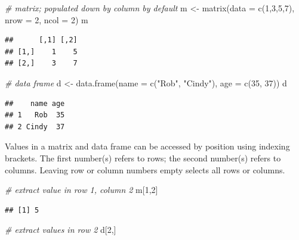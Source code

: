 \documentclass[
]{book}
\newenvironment{Shaded}{\begin{snugshade}}{\end{snugshade}}
\newcommand{\AttributeTok}[1]{\textcolor[rgb]{0.77,0.63,0.00}{#1}}
\newcommand{\CommentTok}[1]{\textcolor[rgb]{0.56,0.35,0.01}{\textit{#1}}}
\newcommand{\DecValTok}[1]{\textcolor[rgb]{0.00,0.00,0.81}{#1}}
\newcommand{\FunctionTok}[1]{\textcolor[rgb]{0.00,0.00,0.00}{#1}}
\newcommand{\NormalTok}[1]{#1}
\newcommand{\OtherTok}[1]{\textcolor[rgb]{0.56,0.35,0.01}{#1}}
\newcommand{\StringTok}[1]{\textcolor[rgb]{0.31,0.60,0.02}{#1}}
\begin{document}
\begin{Shaded}
\begin{Highlighting}[]
\CommentTok{\# matrix; populated down by column by default}
\NormalTok{m }\OtherTok{\textless{}{-}} \FunctionTok{matrix}\NormalTok{(}\AttributeTok{data =} \FunctionTok{c}\NormalTok{(}\DecValTok{1}\NormalTok{,}\DecValTok{3}\NormalTok{,}\DecValTok{5}\NormalTok{,}\DecValTok{7}\NormalTok{), }\AttributeTok{nrow =} \DecValTok{2}\NormalTok{, }\AttributeTok{ncol =} \DecValTok{2}\NormalTok{)}
\NormalTok{m}
\end{Highlighting}
\end{Shaded}

\begin{verbatim}
##      [,1] [,2]
## [1,]    1    5
## [2,]    3    7
\end{verbatim}

\begin{Shaded}
\begin{Highlighting}[]
\CommentTok{\# data frame}
\NormalTok{d }\OtherTok{\textless{}{-}} \FunctionTok{data.frame}\NormalTok{(}\AttributeTok{name =} \FunctionTok{c}\NormalTok{(}\StringTok{"Rob"}\NormalTok{, }\StringTok{"Cindy"}\NormalTok{),}
                \AttributeTok{age =} \FunctionTok{c}\NormalTok{(}\DecValTok{35}\NormalTok{, }\DecValTok{37}\NormalTok{))}
\NormalTok{d}
\end{Highlighting}
\end{Shaded}

\begin{verbatim}
##    name age
## 1   Rob  35
## 2 Cindy  37
\end{verbatim}

Values in a matrix and data frame can be accessed by position using indexing brackets. The first number(s) refers to rows; the second number(s) refers to columns. Leaving row or column numbers empty selects all rows or columns.

\begin{Shaded}
\begin{Highlighting}[]
\CommentTok{\# extract value in row 1, column 2}
\NormalTok{m[}\DecValTok{1}\NormalTok{,}\DecValTok{2}\NormalTok{]}
\end{Highlighting}
\end{Shaded}

\begin{verbatim}
## [1] 5
\end{verbatim}

\begin{Shaded}
\begin{Highlighting}[]
\CommentTok{\# extract values in row 2}
\NormalTok{d[}\DecValTok{2}\NormalTok{,]}
\end{Highlighting}
\end{Shaded}
\end{document}
